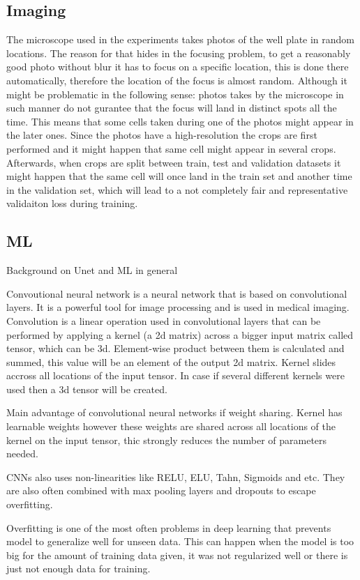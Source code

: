 \subsection{Imaging}
The microscope used in the experiments takes photos of the well plate in random locations. The reason for that hides in the focusing problem, to get a reasonably good photo without blur it has to focus on a specific location, this is done there automatically, therefore the location of the focus is almost random. Although it might be problematic in the following sense: photos takes by the microscope in such manner do not gurantee that the focus will land in distinct spots all the time. This means that some cells taken during one of the photos might appear in the later ones. Since the photos have a high-resolution the crops are first performed and it might happen that same cell might appear in several crops. Afterwards, when crops are split between train, test and validation datasets it might happen that the same cell will once land in the train set and another time in the validation set, which will lead to a not completely fair and representative validaiton loss during training.

\subsection{ML}
Background on Unet and ML in general

Convoutional neural network is a neural network that is based on convolutional layers. It is a powerful tool for image processing and is used in medical imaging. Convolution is a linear operation used in convolutional layers that can be performed by applying a kernel (a 2d matrix) across a bigger input matrix called tensor, which can be 3d. Element-wise product between them is calculated and summed, this value will be an element of the output 2d matrix. Kernel slides accross all locations of the input tensor. In case if several different kernels were used then a 3d tensor will be created. 

Main advantage of convolutional neural networks if weight sharing. Kernel has learnable weights however these weights are shared across all locations of the kernel on the input tensor, thic strongly reduces the number of parameters needed.

CNNs also uses non-linearities like RELU, ELU, Tahn, Sigmoids and etc. They are also often combined with max pooling layers and dropouts to escape overfitting. 

Overfitting is one of the most often problems in deep learning that prevents model to generalize well for unseen data. This can happen when the model is too big for the amount of training data given, it was not regularized well or there is just not enough data for training. 


